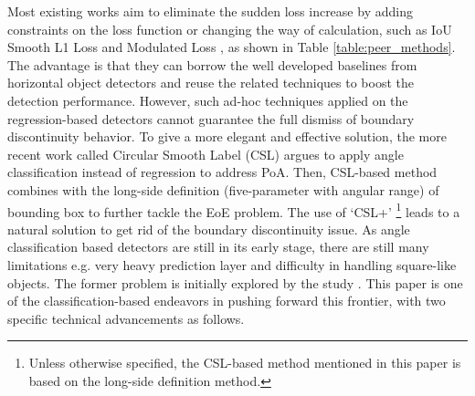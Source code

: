 \documentclass[final]{cvpr}
\begin{document}
Most existing works aim to eliminate the sudden loss increase by adding constraints on the loss function or changing the way of calculation, such as IoU Smooth L1 Loss \cite{yang2019scrdet} and Modulated Loss \cite{qian2019learning}, as shown in Table \ref{table:peer_methods}. The advantage is that they can borrow the well developed baselines from horizontal object detectors and reuse the related techniques to boost the detection performance. However, such ad-hoc techniques applied on the regression-based detectors cannot guarantee the full dismiss of boundary discontinuity behavior. To give a more elegant and effective solution, the more recent work called Circular Smooth Label (CSL) \cite{yang2020arbitrary, yang2020on} argues to apply angle classification instead of regression to address PoA. Then, CSL-based method combines with the long-side definition (five-parameter with  angular range) of bounding box to further tackle the EoE problem. The use of `CSL+' \footnote{Unless otherwise specified, the CSL-based method mentioned in this paper is based on the long-side definition method.} leads to a natural solution to get rid of the boundary discontinuity issue. As angle classification based detectors are still in its early stage, there are still many limitations e.g. very heavy prediction layer and difficulty in handling square-like objects. The former problem is initially explored by the study \cite{yang2020on}. This paper is one of the classification-based endeavors in pushing forward this frontier, with two specific technical advancements as follows.

\begin{table}[!tb]
	\centering
		\vspace{-10pt}
	\caption{Comparison between different solutions for periodicity of angle (PoA), exchangeability of edges (EoE) and square-like problem (SLP) on DOTA val set. The  indicates that the method suffers the corresponding problem.}
	\label{table:peer_methods}

\end{table}
\end{document}
